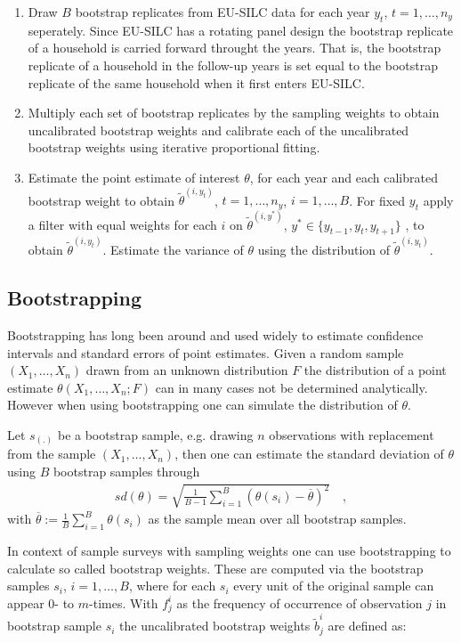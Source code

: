 \documentclass{scrartcl}\usepackage[]{graphicx}\usepackage[]{color}
\begin{document}
\begin{enumerate}
\item Draw $B$ bootstrap replicates from EU-SILC data for each year $y_t$, $t=1,\ldots,n_y$ seperately. Since EU-SILC has a rotating panel design the bootstrap replicate of a household is carried forward throught the years. That is, the bootstrap replicate of a household in the follow-up years is set equal to the bootstrap replicate of the same household when it first enters EU-SILC.
\item Multiply each set of bootstrap replicates by the sampling weights to obtain uncalibrated bootstrap weights and calibrate each of the uncalibrated bootstrap weights using iterative proportional fitting.
\item Estimate the point estimate of interest $\theta$, for each year and each calibrated bootstrap weight to obtain $\tilde{\theta}^{(i,y_t)}$, $t=1,\ldots,n_y$, $i=1,\ldots,B$. For fixed $y_t$ apply a filter with equal weights for each $i$ on $\tilde{\theta}^{(i,y^*)}$, $y^*\in \{y_{t-1},y_{t},y_{t+1}\}$ , to obtain $\tilde{\theta}^{(i,y_t)}$. Estimate the variance of $\theta$ using the distribution of $\tilde{\theta}^{(i,y_t)}$.
\end{enumerate}

\subsection{Bootstrapping}
Bootstrapping has long been around and used widely to estimate confidence intervals and standard errors of point estimates.\citep{efron1979}
Given a random sample $(X_1,\ldots,X_n)$ drawn from an unknown distribution $F$ the distribution of a point estimate $\theta(X_1,\ldots,X_n;F)$ can in many cases not be determined analytically. However when using bootstrapping one can simulate the distribution of $\theta$.

Let $s_{(.)}$ be a bootstrap sample, e.g. drawing $n$ observations with replacement from the sample $(X_1,\ldots,X_n)$, then one can estimate the standard deviation of $\theta$  using $B$ bootstrap samples through
\begin{align*}
  sd(\theta) = \sqrt{\frac{1}{B-1}\sum\limits_{i=1}^B (\theta(s_i)-\overline{\theta})^2} \quad,
\end{align*}
with $\overline{\theta}:=\frac{1}{B}\sum\limits_{i=1}^B\theta(s_i)$ as the sample mean over all bootstrap samples.

In context of sample surveys with sampling weights one can use bootstrapping to calculate so called bootstrap weights. These are computed via the bootstrap samples $s_{i}$, $i=1,\ldots,B$, where for each $s_{i}$ every unit of the original sample can appear $0$- to $m$-times. With $f_j^{i}$ as the frequency of occurrence of observation $j$ in bootstrap sample $s_i$ the uncalibrated bootstrap weights $\tilde{b}_{j}^{i}$ are defined as:
\end{document}

